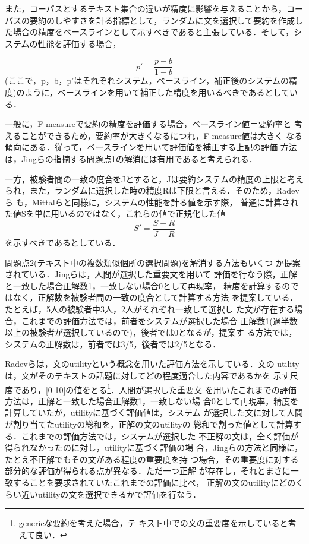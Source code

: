 また，コーパスとするテキスト集合の違いが精度に影響を与えることから，コー
パスの要約のしやすさを計る指標として，ランダムに文を選択して要約を作成し
た場合の精度をベースラインとして示すべきであると主張している．そして，シ
ステムの性能を評価する場合，

\[ p' = \frac{p-b}{1-b} \]
(ここで，p，b，p'はそれぞれシステム，ベースライン，補正後のシステムの精
度)のように，ベースラインを用いて補正した精度を用いるべきであるとしてい
る．

一般に，F-measureで要約の精度を評価する場合，ベースライン値＝要約率と
考えることができるため，要約率が大きくなるにつれ，F-measure値は大きく
なる傾向にある．従って，ベースラインを用いて評価値を補正する上記の評価
方法は，Jingらの指摘する問題点1の解消には有用であると考えられる．

一方，被験者間の一致の度合をJとすると，Jは要約システムの精度の上限と考え
られ，また，ランダムに選択した時の精度Rは下限と言える．そのため，Radevら
\cite{radev:00:a}も，Mittalらと同様に，システムの性能を計る値を示す際，
普通に計算された値Sを単に用いるのではなく，これらの値で正規化した値\[ S'
= \frac{S-R}{J-R} \]を示すべきであるとしている．

問題点2(テキスト中の複数類似個所の選択問題)を解消する方法もいくつ
か提案されている．Jingら\cite{jing:98:a}は，人間が選択した重要文を用いて
評価を行なう際，正解と一致した場合正解数1，一致しない場合0として再現率，
精度を計算するのではなく，正解数を被験者間の一致の度合として計算する方法
を提案している．たとえば，5人の被験者中3人，2人がそれぞれ一致して選択し
た文が存在する場合，これまでの評価方法では，前者をシステムが選択した場合
正解数1(過半数以上の被験者が選択しているので)，後者では0となるが，提案す
る方法では，システムの正解数は，前者では3/5，後者では2/5となる．

Radevら\cite{radev:00:a}は，文のutilityという概念を用いた評価方法を示している．文の
utilityは，文がそのテキストの話題に対してどの程度適合した内容であるかを
示す尺度であり，[0-10]の値をとる\footnote{genericな要約を考えた場合，テ
キスト中での文の重要度を示していると考えて良い．}．人間が選択した重要文
を用いたこれまでの評価方法は，正解と一致した場合正解数1，一致しない場
合0として再現率，精度を計算していたが，utilityに基づく評価値は，システム
が選択した文に対して人間が割り当てたutilityの総和を，正解の文のutilityの
総和で割った値として計算する．これまでの評価方法では，システムが選択した
不正解の文は，全く評価が得られなかったのに対し，utilityに基づく評価の場
合，Jingらの方法と同様に，たとえ不正解でもその文がある程度の重要度を持
つ場合，その重要度に対する部分的な評価が得られる点が異なる．ただ一つ正解
が存在し，それとまさに一致することを要求されていたこれまでの評価に比べ，
正解の文のutilityにどのくらい近いutilityの文を選択できるかで評価を行なう．

